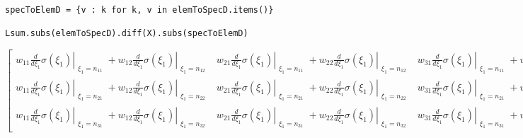 \documentclass[
]{article}
\begin{document}
\begin{verbatim}

specToElemD = {v : k for k, v in elemToSpecD.items()}

Lsum.subs(elemToSpecD).diff(X).subs(specToElemD)
\end{verbatim}

\(\displaystyle \left[\begin{matrix}w_{11} \left. \frac{d}{d \xi_{1}} \sigma{\left(\xi_{1} \right)} \right|_{\substack{ \xi_{1}=n_{11} }} + w_{12} \left. \frac{d}{d \xi_{1}} \sigma{\left(\xi_{1} \right)} \right|_{\substack{ \xi_{1}=n_{12} }} & w_{21} \left. \frac{d}{d \xi_{1}} \sigma{\left(\xi_{1} \right)} \right|_{\substack{ \xi_{1}=n_{11} }} + w_{22} \left. \frac{d}{d \xi_{1}} \sigma{\left(\xi_{1} \right)} \right|_{\substack{ \xi_{1}=n_{12} }} & w_{31} \left. \frac{d}{d \xi_{1}} \sigma{\left(\xi_{1} \right)} \right|_{\substack{ \xi_{1}=n_{11} }} + w_{32} \left. \frac{d}{d \xi_{1}} \sigma{\left(\xi_{1} \right)} \right|_{\substack{ \xi_{1}=n_{12} }}\\w_{11} \left. \frac{d}{d \xi_{1}} \sigma{\left(\xi_{1} \right)} \right|_{\substack{ \xi_{1}=n_{21} }} + w_{12} \left. \frac{d}{d \xi_{1}} \sigma{\left(\xi_{1} \right)} \right|_{\substack{ \xi_{1}=n_{22} }} & w_{21} \left. \frac{d}{d \xi_{1}} \sigma{\left(\xi_{1} \right)} \right|_{\substack{ \xi_{1}=n_{21} }} + w_{22} \left. \frac{d}{d \xi_{1}} \sigma{\left(\xi_{1} \right)} \right|_{\substack{ \xi_{1}=n_{22} }} & w_{31} \left. \frac{d}{d \xi_{1}} \sigma{\left(\xi_{1} \right)} \right|_{\substack{ \xi_{1}=n_{21} }} + w_{32} \left. \frac{d}{d \xi_{1}} \sigma{\left(\xi_{1} \right)} \right|_{\substack{ \xi_{1}=n_{22} }}\\w_{11} \left. \frac{d}{d \xi_{1}} \sigma{\left(\xi_{1} \right)} \right|_{\substack{ \xi_{1}=n_{31} }} + w_{12} \left. \frac{d}{d \xi_{1}} \sigma{\left(\xi_{1} \right)} \right|_{\substack{ \xi_{1}=n_{32} }} & w_{21} \left. \frac{d}{d \xi_{1}} \sigma{\left(\xi_{1} \right)} \right|_{\substack{ \xi_{1}=n_{31} }} + w_{22} \left. \frac{d}{d \xi_{1}} \sigma{\left(\xi_{1} \right)} \right|_{\substack{ \xi_{1}=n_{32} }} & w_{31} \left. \frac{d}{d \xi_{1}} \sigma{\left(\xi_{1} \right)} \right|_{\substack{ \xi_{1}=n_{31} }} + w_{32} \left. \frac{d}{d \xi_{1}} \sigma{\left(\xi_{1} \right)} \right|_{\substack{ \xi_{1}=n_{32} }}\end{matrix}\right]\)
\end{document}
